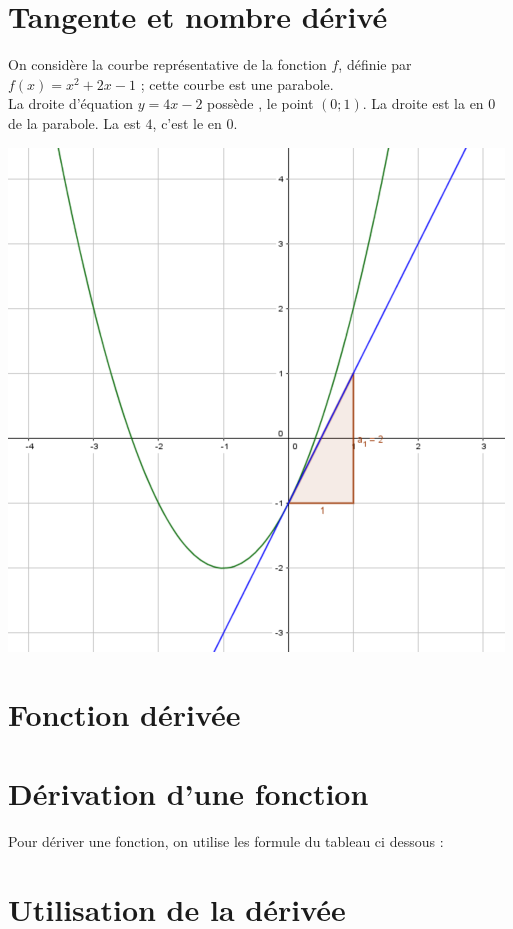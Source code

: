 \documentclass[12pt,a4paper]{article}
\date{}
\title{}
\newcommand{\disp}{true}
\begin{document}
	
	\section{Tangente et nombre dérivé}
	
	
	\begin{mydefs}
	\begin{multicols}{2}
		

	
	
	
	On considère la courbe représentative de la fonction $f$, définie par $f(x) = x^2 + 2x - 1$ ; cette courbe est une parabole.\\
	
	
	La droite d'équation $y = 4x - 2$ possède , le point $(0 ; 1)$. La droite est la  en 0 de la parabole.
	La  est $4$, c'est le  en 0. 
	
	\includegraphics[scale=0.5]{./img/ex}
	\end{multicols}
	\end{mydefs}
	
	\section{Fonction dérivée}
	
	\section{Dérivation d'une fonction}
	
	Pour dériver une fonction, on utilise les formule du tableau ci dessous :
	
	\begin{center}
		\drv{\disp}
	\end{center}
	
	\section{Utilisation de la dérivée}
\end{document}
